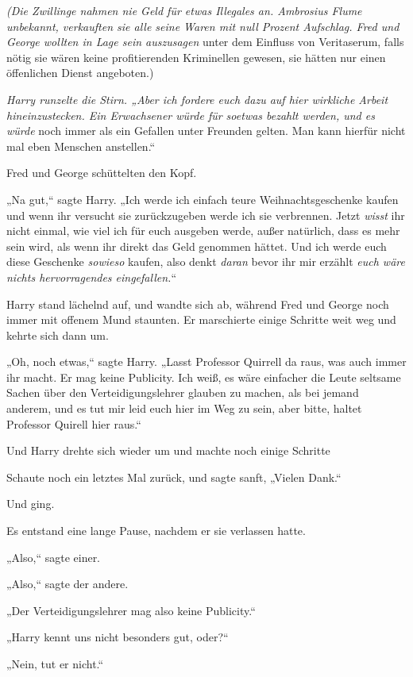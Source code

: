 {\emph{(Die Zwillinge nahmen nie Geld für etwas Illegales an. Ambrosius Flume unbekannt, verkauften sie alle seine Waren mit null Prozent Aufschlag. Fred und George wollten in Lage sein auszusagen \later} unter dem Einfluss von Veritaserum, falls nötig \later sie wären keine profitierenden Kriminellen gewesen, sie hätten nur einen öffenlichen Dienst angeboten.)

\emph{Harry runzelte die Stirn. „Aber ich fordere euch dazu auf hier wirkliche Arbeit hineinzustecken. Ein Erwachsener würde für soetwas bezahlt werden, und es würde} noch immer als ein Gefallen unter Freunden gelten. Man kann hierfür nicht mal eben Menschen anstellen.“

Fred und George schüttelten den Kopf.

„Na gut,“ sagte Harry. „Ich werde ich einfach teure Weihnachtsgeschenke kaufen und wenn ihr versucht sie zurückzugeben werde ich sie verbrennen. Jetzt \emph{wisst} ihr nicht einmal, wie viel ich für euch ausgeben werde, außer natürlich, dass es mehr sein wird, als wenn ihr direkt das Geld genommen hättet. Und ich werde euch diese Geschenke \emph{sowieso} kaufen, also denkt \emph{daran} bevor ihr mir erzählt \emph{euch wäre nichts hervorragendes eingefallen.}“

Harry stand lächelnd auf, und wandte sich ab, während Fred und George noch immer mit offenem Mund staunten. Er marschierte einige Schritte weit weg und kehrte sich dann um.

„Oh, noch etwas,“ sagte Harry. „Lasst Professor Quirrell da raus, was auch immer ihr macht. Er mag keine Publicity. Ich weiß, es wäre einfacher die Leute seltsame Sachen über den Verteidigungslehrer glauben zu machen, als bei jemand anderem, und es tut mir leid euch hier im Weg zu sein, aber bitte, haltet Professor Quirell hier raus.“

Und Harry drehte sich wieder um und machte noch einige Schritte \later

Schaute noch ein letztes Mal zurück, und sagte sanft, „Vielen Dank.“

Und ging.

Es entstand eine lange Pause, nachdem er sie verlassen hatte.

„Also,“ sagte einer.

„Also,“ sagte der andere.

„Der Verteidigungslehrer mag also keine Publicity.“

„Harry kennt uns nicht besonders gut, oder?“

„Nein, tut er nicht.“

}
